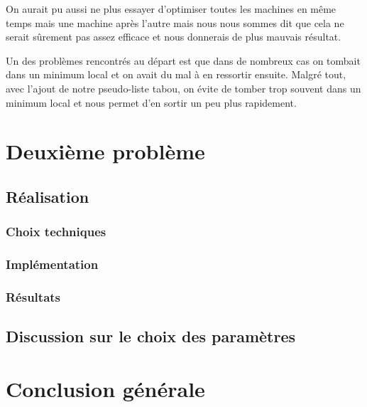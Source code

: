 \documentclass{report}
\begin{document}
On aurait pu aussi ne plus essayer d'optimiser toutes les machines en même temps mais une machine après l'autre mais nous nous sommes dit que cela ne serait sûrement pas assez efficace et nous donnerais de plus mauvais résultat.

Un des problèmes rencontrés au départ est que dans de nombreux cas on tombait dans un minimum local et on avait du mal à en ressortir ensuite.  Malgré tout, avec l'ajout de notre pseudo-liste tabou, on évite de tomber trop souvent dans un minimum local et nous permet d'en sortir un peu plus rapidement.

\newpage

\chapter{Deuxième problème}
\minitoc
\section{Réalisation}
\subsection{Choix techniques}

\subsection{Implémentation}

\subsection{Résultats}

\section{Discussion sur le choix des paramètres}

\chapter{Conclusion générale}
\end{document}
